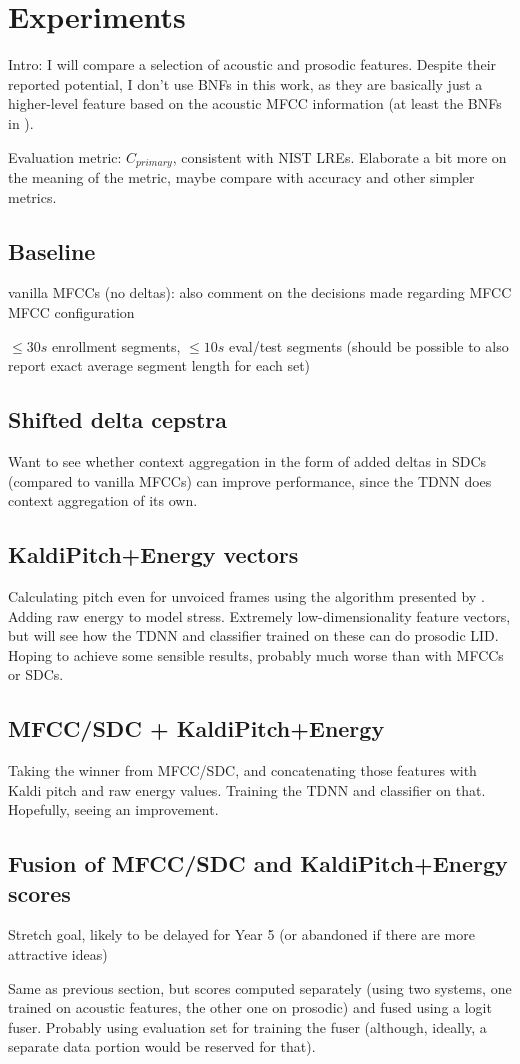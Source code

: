 \documentclass[bsc,frontabs,twoside,singlespacing,parskip,deptreport]{infthesis}
\begin{document}
\chapter{Experiments}{
  Intro: I will compare a selection of acoustic and prosodic features. Despite their reported potential, I don't use BNFs in this work, as they are basically just a higher-level feature based on the acoustic MFCC information (at least the BNFs in \cite{Snyder_et_al_2018}).

  Evaluation metric: $C_{primary}$, consistent with NIST LREs. Elaborate a bit more on the meaning of the metric, maybe compare with accuracy and other simpler metrics.

  \section{Baseline}{
    vanilla MFCCs (no deltas): also comment on the decisions made regarding MFCC MFCC configuration

    $\leq 30s$ enrollment segments, $\leq 10s$ eval/test segments (should be possible to also report exact average segment length for each set)
  }

  \section{Shifted delta cepstra}{
    Want to see whether context aggregation in the form of added deltas in SDCs (compared to vanilla MFCCs) can improve performance, since the TDNN does context aggregation of its own.
  }

  \section{KaldiPitch+Energy vectors}{
    Calculating pitch even for unvoiced frames using the algorithm presented by \cite{Ghahremani_et_al_2014}. Adding raw energy to model stress. Extremely low-dimensionality feature vectors, but will see how the TDNN and classifier trained on these can do prosodic LID. Hoping to achieve some sensible results, probably much worse than with MFCCs or SDCs.
  }
  
  \section{MFCC/SDC + KaldiPitch+Energy}{
    Taking the winner from MFCC/SDC, and concatenating those features with Kaldi pitch and raw energy values. Training the TDNN and classifier on that. Hopefully, seeing an improvement.
  }
  
  \section{Fusion of MFCC/SDC and KaldiPitch+Energy scores}{
    Stretch goal, likely to be delayed for Year 5 (or abandoned if there are more attractive ideas)

    Same as previous section, but scores computed separately (using two systems, one trained on acoustic features, the other one on prosodic) and fused using a logit fuser. Probably using evaluation set for training the fuser (although, ideally, a separate data portion would be reserved for that).
  }
}
\end{document}
